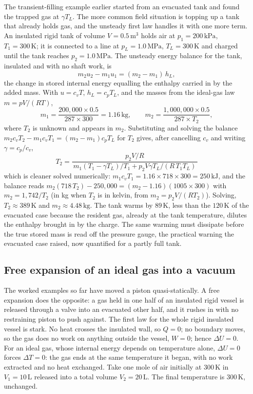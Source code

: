 The transient-filling example earlier started from an evacuated tank and
found the trapped gas at $\gamma T_L$. The more common field situation is
topping up a tank that already holds gas, and the unsteady first law
handles it with one more term. An insulated rigid tank of volume
$V = 0.5\,\text{m}^3$ holds air at $p_1 = 200\,\text{kPa}$,
$T_1 = 300\,\si{\kelvin}$; it is connected to a line at
$p_L = 1.0\,\text{MPa}$, $T_L = 300\,\si{\kelvin}$ and charged until the
tank reaches $p_2 = 1.0\,\text{MPa}$. The unsteady energy balance for the
tank, insulated and with no shaft work, is
\[
m_2 u_2 - m_1 u_1 = (m_2 - m_1)\,h_L,
\]
the change in stored internal energy equalling the enthalpy carried in by
the added mass. With $u = c_v T$, $h_L = c_p T_L$, and the masses from the
ideal-gas law $m = pV/(RT)$,
\[
m_1 = \frac{200{,}000 \times 0.5}{287 \times 300} = 1.16\,\text{kg},
\qquad
m_2 = \frac{1{,}000{,}000 \times 0.5}{287 \times T_2},
\]
where $T_2$ is unknown and appears in $m_2$. Substituting and solving the
balance $m_2 c_v T_2 - m_1 c_v T_1 = (m_2 - m_1) c_p T_L$ for $T_2$ gives,
after cancelling $c_v$ and writing $\gamma = c_p/c_v$,
\[
T_2 = \frac{p_2 V/R}{\,m_1 (T_1 - \gamma T_L)/T_1 + p_2 V \gamma T_L/(R\,
T_1 T_L)\,}
\]
which is cleaner solved numerically: $m_1 c_v T_1 = 1.16 \times 718
\times 300 = 250\,\text{kJ}$, and the balance reads
$m_2 (718\,T_2) - 250{,}000 = (m_2 - 1.16)(1005 \times 300)$ with
$m_2 = 1{,}742/T_2$ (in kg when $T_2$ is in kelvin, from $m_2 = p_2 V/
(R T_2)$). Solving, $T_2 \approx 389\,\si{\kelvin}$ and
$m_2 \approx 4.48\,\text{kg}$. The tank warms by $89\,\si{\kelvin}$,
less than the $120\,\si{\kelvin}$ of the evacuated case because the
resident gas, already at the tank temperature, dilutes the enthalpy
brought in by the charge. The same warming must dissipate before the
true stored mass is read off the pressure gauge, the practical warning
the evacuated case raised, now quantified for a partly full tank.

\subsection{Free expansion of an ideal gas into a vacuum}

The worked examples so far have moved a piston quasi-statically. A free
expansion does the opposite: a gas held in one half of an insulated rigid
vessel is released through a valve into an evacuated other half, and it
rushes in with no restraining piston to push against. The first law for the
whole rigid insulated vessel is stark. No heat crosses the insulated wall, so
$Q = 0$; no boundary moves, so the gas does no work on anything outside the
vessel, $W = 0$; hence $\Delta U = 0$. For an ideal gas, whose internal
energy depends on temperature alone, $\Delta U = 0$ forces $\Delta T = 0$:
the gas ends at the same temperature it began, with no work extracted and no
heat exchanged. Take one mole of air initially at $300\,\si{\kelvin}$ in
$V_1 = 10\,\si{\liter}$ released into a total volume $V_2 = 20\,\si{\liter}$.
The final temperature is $300\,\si{\kelvin}$, unchanged.

